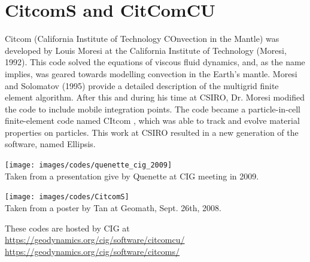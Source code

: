 \section{CitcomS and CitComCU} 

Citcom (California Institute of Technology COnvection in the Mantle) was  
developed by Louis Moresi at the California Institute of Technology (Moresi, 1992). 
This code solved the equations of viscous fluid dynamics, and, as the name implies, 
was geared towards modelling convection in the Earth's mantle. Moresi and 
Solomatov (1995) provide a detailed description of the multigrid
finite element algorithm. After this and during his time at CSIRO, Dr. Moresi 
modified the code to include mobile integration points. The code became a 
particle-in-cell finite-element code named CItcom , which was able to track 
and evolve material properties on particles. This work at
CSIRO resulted in a new generation of the software, named Ellipsis.

\begin{center}
\texttt{[image: images/codes/quenette\_cig\_2009]}\\
{\captionfont Taken from a presentation give by Quenette at CIG meeting in 2009.}
\end{center}

\begin{center}
\texttt{[image: images/codes/CitcomS]}\\
{\captionfont Taken from a poster by Tan \etal at Geomath, Sept. 26th, 2008.}
\end{center}

These codes are hosted by CIG at\\
\url{https://geodynamics.org/cig/software/citcomcu/}  \\
\url{https://geodynamics.org/cig/software/citcoms/}

